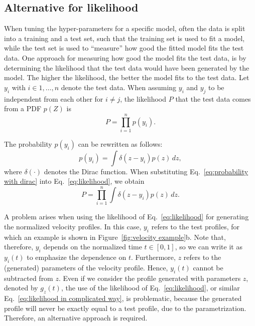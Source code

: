 \documentclass[10pt,final,a4paper,oneside,onecolumn]{article}
\theoremstyle{plain}\newtheorem{definition}{Definition}[section]    %
\theoremstyle{definition}\newtheorem{example}{Example}[section]     %
\theoremstyle{remark}\newtheorem{remarkenv}{Remark}[section]        %
\begin{document}
\subsection{Alternative for likelihood}
\label{sec:method alternative likelihood}

When tuning the hyper-parameters for a specific model, often the data is split into a training and a test set, such that the training set is used to fit a model, while the test set is used to ``measure'' how good the fitted model fits the test data. One approach for measuring how good the model fits the test data, is by determining the likelihood that the test data would have been generated by the model. The higher the likelihood, the better the model fits to the test data. Let $y_i$ with $i \in {1, \ldots, n}$ denote the test data. When assuming $y_i$ and $y_j$ to be independent from each other for $i \neq j$, the likelihood $P$ that the test data comes from a PDF $p(Z)$ is
\begin{equation} \label{eq:likelihood}
	P = \prod_{i=1}^n p(y_i).
\end{equation}

The probability $p(y_i)$ can be rewritten as follows:
\begin{equation} \label{eq:probability with dirac}
	p(y_i) = \int \delta(z-y_i) p(z) \,dz,
\end{equation}
where $\delta(\cdot)$ denotes the Dirac function. When substituting Eq.~\eqref{eq:probability with dirac} into Eq.~\eqref{eq:likelihood}, we obtain
\begin{equation} \label{eq:likelihood in complicated way}
	P = \prod_{i=1}^n \int \delta(z - y_i) p(z) \,dz.
\end{equation}

A problem arises when using the likelihood of Eq.~\eqref{eq:likelihood} for generating the normalized velocity profiles. In this case, $y_i$ refers to the test profiles, for which an example is shown in Figure~\ref{fig:velocity example}b. Note that, therefore, $y_i$ depends on the normalized time $t \in [0,1]$, so we can write it as $y_i(t)$ to emphasize the dependence on $t$. Furthermore, $z$ refers to the (generated) parameters of the velocity profile. Hence, $y_i(t)$ cannot be subtracted from $z$. Even if we consider the profile generated with parameters $z$, denoted by $g_z(t)$, the use of the likelihood of Eq.~\eqref{eq:likelihood}, or similar Eq.~\eqref{eq:likelihood in complicated way}, is problematic, because the generated profile will never be exactly equal to a test profile, due to the parametrization. Therefore, an alternative approach is required.
\end{document}

